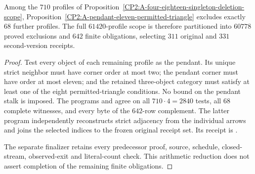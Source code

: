 \begin{proposition}
\label{CP2:A-four-eighteen-pendant-eleven-scope}
Among the $710$ profiles of
Proposition~\ref{CP2:A-four-eighteen-singleton-deletion-scope},
Proposition~\ref{CP2:A-pendant-eleven-permitted-triangle}
excludes exactly $68$ further profiles.  The full
$61420$-profile scope is therefore partitioned into
$60778$ proved exclusions and $642$ finite obligations,
selecting $311$ original and $331$ second-version receipts.
\end{proposition}
\begin{proof}
Test every object of each remaining profile as the
pendant.  Its unique strict neighbor must have corner
order at most two; the pendant corner must have order
at most eleven; and the retained three-object category
must satisfy at least one of the eight permitted-triangle
conditions.  No bound on the pendant stalk is imposed.
The programs
and
agree on all $710\cdot4=2840$ tests, all $68$ complete
witnesses, and every byte of the $642$-row complement.
The latter program independently reconstructs strict
adjacency from the individual arrows and joins the
selected indices to the frozen original receipt set.
Its receipt is
.

The separate finalizer
retains every predecessor proof, source, schedule,
closed-stream, observed-exit and literal-count check.
This arithmetic reduction does not assert completion
of the remaining finite obligations.
\end{proof}
